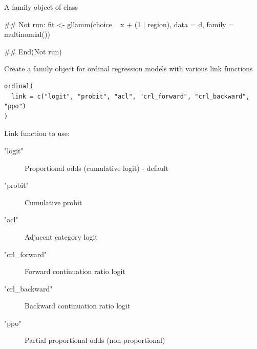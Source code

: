 \documentclass[a4paper]{book}
\begin{document}
%
\begin{Value}
A family object of class 
\end{Value}
%
\begin{Examples}
\begin{ExampleCode}
## Not run: 
fit <- gllamm(choice ~ x + (1 | region), data = d, family = multinomial())

## End(Not run)

\end{ExampleCode}
\end{Examples}
%
\begin{Description}
Create a family object for ordinal regression models with various link functions
\end{Description}
%
\begin{Usage}
\begin{verbatim}
ordinal(
  link = c("logit", "probit", "acl", "crl_forward", "crl_backward", "ppo")
)
\end{verbatim}
\end{Usage}
%
\begin{Arguments}
\begin{ldescription}
\item[\code{link}] Link function to use:
\begin{description}

\item["logit"] Proportional odds (cumulative logit) - default
\item["probit"] Cumulative probit
\item["acl"] Adjacent category logit
\item["crl\_forward"] Forward continuation ratio logit
\item["crl\_backward"] Backward continuation ratio logit
\item["ppo"] Partial proportional odds (non-proportional)

\end{description}

\end{ldescription}
\end{Arguments}
%
\end{document}
